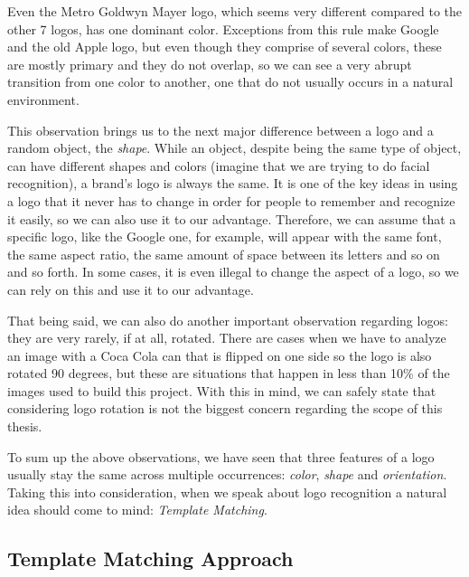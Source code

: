 
Even the Metro Goldwyn Mayer logo, which seems very different compared to the
other 7 logos, has one dominant color. Exceptions from this rule make Google
and the old Apple logo, but even though they comprise of several colors, these
are mostly primary and they do not overlap, so we can see a very abrupt
transition from one color to another, one that do not usually occurs in a
natural environment.

This observation brings us to the next major difference between a logo and a
random object, the \textit{shape}. While an object, despite being the same
type of object, can have different shapes and colors (imagine that we are
trying to do facial recognition), a brand's logo is always the same. It is one
of the key ideas in using a logo that it never has to change in order for
people to remember and recognize it easily, so we can also use it to our
advantage. Therefore, we can assume that a specific logo, like the Google one,
for example, will appear with the same font, the same aspect ratio, the
same amount of space between its letters and so on and so forth. In some
cases, it is even illegal to change the aspect of a logo, so we can rely on
this and use it to our advantage.

That being said, we can also do another important observation regarding logos:
they are very rarely, if at all, rotated. There are cases when we have to
analyze an image with a Coca Cola can that is flipped on one side so the logo
is also rotated 90 degrees, but these are situations that happen in less than
10\% of the images used to build this project. With this in mind, we can
safely state that considering logo rotation is not the biggest concern
regarding the scope of this thesis.

To sum up the above observations, we have seen that three features of a logo
usually stay the same across multiple occurrences: \textit{color},
\textit{shape} and \textit{orientation}. Taking this into consideration, when we
speak about logo recognition a natural idea should come to mind:
\textit{Template Matching}.

\subsection{Template Matching Approach}

